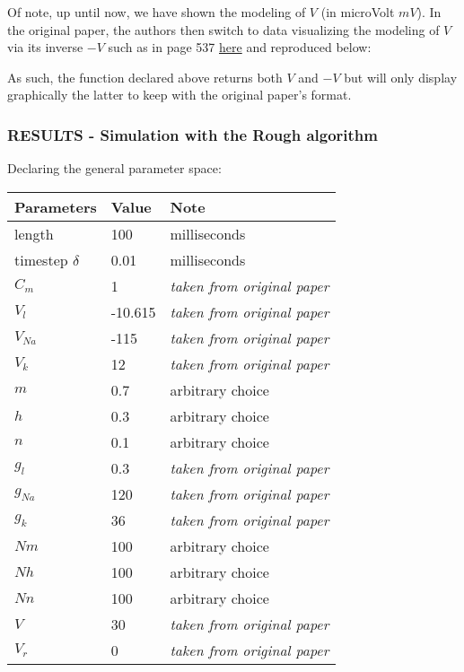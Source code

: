 \documentclass[
]{article}
\begin{document}
Of note, up until now, we have shown the modeling of \(V\) (in microVolt
\(mV\)). In the original paper, the authors then switch to data
visualizing the modeling of \(V\) via its inverse \(-V\) such as in page
537
\href{https://physiology.arizona.edu/sites/default/files/hodgkinhuxley1952_0.pdf}{here}
and reproduced below:

As such, the function declared above returns both \(V\) and \(-V\) but
will only display graphically the latter to keep with the original
paper's format.

\hypertarget{results---simulation-with-the-rough-algorithm}{%
\subsubsection{RESULTS - Simulation with the Rough
algorithm}\label{results---simulation-with-the-rough-algorithm}}

Declaring the general parameter space:

\begin{longtable}[]{@{}lll@{}}
\toprule
Parameters & Value & Note \\
\midrule
\endhead
length & 100 & milliseconds \\
timestep \(\delta\) & 0.01 & milliseconds \\
\(C_m\) & 1 & \emph{taken from original paper} \\
\(V_l\) & -10.615 & \emph{taken from original paper} \\
\(V_{Na}\) & -115 & \emph{taken from original paper} \\
\(V_k\) & 12 & \emph{taken from original paper} \\
\(m\) & 0.7 & arbitrary choice \\
\(h\) & 0.3 & arbitrary choice \\
\(n\) & 0.1 & arbitrary choice \\
\(g_l\) & 0.3 & \emph{taken from original paper} \\
\(g_{Na}\) & 120 & \emph{taken from original paper} \\
\(g_k\) & 36 & \emph{taken from original paper} \\
\(Nm\) & 100 & arbitrary choice \\
\(Nh\) & 100 & arbitrary choice \\
\(Nn\) & 100 & arbitrary choice \\
\(V\) & 30 & \emph{taken from original paper} \\
\(V_r\) & 0 & \emph{taken from original paper} \\
\bottomrule
\end{longtable}
\end{document}
